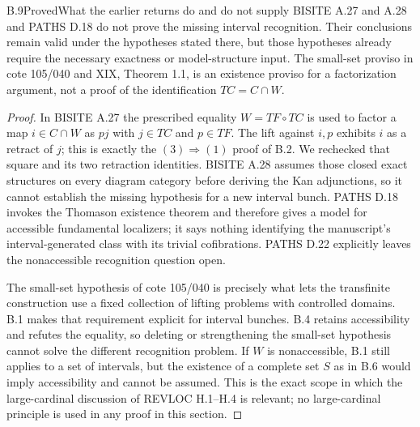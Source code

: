 \begin{claim}{B.9}{Proved}{What the earlier returns do and do not supply}\label{B9}
BISITE A.27 and A.28 and PATHS D.18 do not prove the missing interval
recognition.  Their conclusions remain valid under the hypotheses stated
there, but those hypotheses already require the necessary exactness or
model-structure input.  The small-set proviso in cote 105/040 and XIX,
Theorem 1.1, is an existence proviso for a factorization argument, not a
proof of the identification $TC=C\cap W$.
\end{claim}
\begin{proof}
In BISITE A.27 the prescribed equality $W=TF\circ TC$ is used to factor a
map $i\in C\cap W$ as $pj$ with $j\in TC$ and $p\in TF$.  The lift
against $i,p$ exhibits $i$ as a retract of $j$; this is exactly the
$(3)\Rightarrow(1)$ proof of B.2.  We rechecked that square and its two
retraction identities.  BISITE A.28 assumes those closed exact structures
on every diagram category before deriving the Kan adjunctions, so it
cannot establish the missing hypothesis for a new interval bunch.
PATHS D.18 invokes the Thomason existence theorem and therefore gives a
model for accessible fundamental localizers; it says nothing identifying
the manuscript's interval-generated class with its trivial cofibrations.
PATHS D.22 explicitly leaves the nonaccessible recognition question open.

The small-set hypothesis of cote 105/040 is precisely what lets the
transfinite construction use a fixed collection of lifting problems with
controlled domains.  B.1 makes that requirement explicit for interval
bunches.  B.4 retains accessibility and refutes the equality, so deleting or
strengthening the small-set hypothesis cannot solve the different
recognition problem.  If $W$ is nonaccessible, B.1 still applies to a set of
intervals, but the existence of a complete set $S$ as in B.6 would imply
accessibility and cannot be assumed.  This is the exact scope in which the
large-cardinal discussion of REVLOC H.1--H.4 is relevant; no large-cardinal
principle is used in any proof in this section.
\end{proof}

